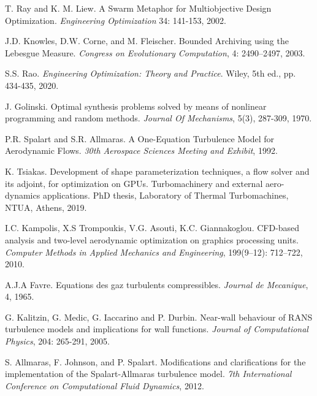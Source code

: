 T. Ray and K. M. Liew. A Swarm Metaphor for 
Multiobjective Design Optimization. \textit{Engineering 
Optimization} 34: 141-153, 2002.

J.D. Knowles, D.W. Corne, and M. Fleischer. Bounded Archiving 
using the Lebesgue Measure. \textit{Congress on Evolutionary 
Computation}, 4: 2490–2497, 2003.

S.S. Rao. \textit{Engineering Optimization: Theory and 
Practice}. Wiley, 5th ed., pp. 434-435, 2020.

J. Golinski. Optimal synthesis problems solved by means of 
nonlinear programming and random methods. \textit{Journal Of 
Mechanisms}, 5(3), 287-309, 1970.

P.R. Spalart and S.R. Allmaras. A One-Equation Turbulence Model 
for Aerodynamic Flows. \textit{30th Aerospace Sciences Meeting and 
Exhibit}, 1992.

K. Tsiakas. Development of shape parameterization techniques, a 
flow solver and its adjoint, for optimization on GPUs. 
Turbomachinery and external aero-dynamics applications. PhD thesis, 
Laboratory of Thermal Turbomachines, NTUA, Athens, 2019.

I.C. Kampolis, X.S Trompoukis, V.G. Asouti, K.C. Giannakoglou. 
CFD-based analysis and two-level aerodynamic optimization on 
graphics processing units. \textit{Computer Methods in Applied 
Mechanics and Engineering}, 199(9–12): 712–722, 2010.

A.J.A Favre. Equations des gaz turbulents compressibles. 
\textit{Journal de Mecanique}, 4, 1965.

G. Kalitzin, G. Medic, G. Iaccarino and P. Durbin. Near-wall 
behaviour of RANS turbulence models and implications for wall 
functions. \textit{Journal of Computational Physics}, 204: 265-291,
2005.

S. Allmaras, F. Johnson, and P. Spalart. Modifications and 
clarifications for the implementation of the Spalart-Allmaras 
turbulence model. \textit{7th International Conference on 
Computational Fluid Dynamics}, 2012.


